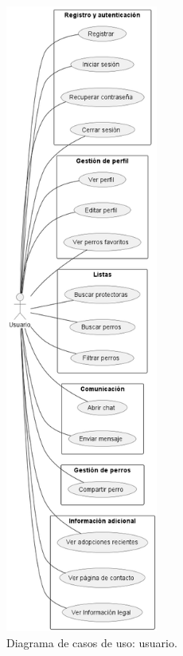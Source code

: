 \documentclass[a4paper, 12pt]{article}
\begin{document}
\begin{figure}[H]
	\begin{center}
		{\includegraphics[width=5cm]{diagram/UserC.png}\par}
		\caption{Diagrama de casos de uso: usuario.}
	\end{center}
\end{figure}
\end{document}
